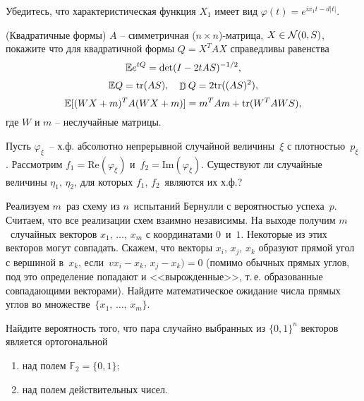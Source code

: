\begin{ordre}
Убедитесь, что характеристическая функция $X_1$ имеет вид $\varphi(t) = e^{ix_1t - d|t|}$.
\end{ordre}

\begin{problem}(Квадратичные формы)
$A$ -- симметричная ($n \times n$)-матрица, $X \in \mathcal{N}(0, S)$, покажите что для квадратичной формы $Q = X^TAX$ справедливы равенства 
\[
\mathrm{{\mathbb E}} e^{tQ} =\det (I - 2t A S)^{-1/2},
\] 
\[
\mathrm{{\mathbb E}} Q = \text{tr}(AS), \quad \mathop{\mathbb{D}}\nolimits Q = 2 \text{tr}((AS)^2),
\]
\[
\mathrm{{\mathbb E}} [ (WX +m)^{T} A (WX +m) ] = m^T A m + \text{tr}(W^TAWS),
\]
где $W$ и $m$ -- неслучайные матрицы.
\end{problem}


\begin{problem}
Пусть $\varphi_{\xi}$~-- х.ф. абсолютно непрерывной случайной величины~$\xi$ с плотностью~$p_{\xi}$. Рассмотрим $f_1 =\text{Re}(\varphi_{\xi})$ и~$f_2 = \text{Im}(\varphi_{\xi}) $. Существуют ли случайные величины $\eta_1,\,\eta_2$, для которых $f_1,\,f_2$~являются их х.ф.? 
\end{problem}



\begin{problem}
Реализуем $m$~раз схему из $n$~испытаний Бернулли с вероятностью успеха~$p$. Считаем, что все реализации схем взаимно независимы. На выходе получим $m$~случайных векторов $x_1,\,\dots,\,x_m$ с координатами $0$~и~$1$. Некоторые из этих векторов могут совпадать. Скажем, что векторы $x_i,\,x_j,\,x_k$ образуют прямой угол с вершиной в~$x_k$, если~$vx_i-x_k,\,x_j - x_k) = 0$ (помимо обычных прямых углов, под это определение попадают и <<вырожденные>>, т.\,е. образованные совпадающими векторами). Найдите математическое ожидание числа прямых углов во множестве~$\{x_1,\,\dots,\,x_m\}$.
\end{problem}






\begin{problem} 
Найдите вероятность того, что пара случайно выбранных из $\{ 0,1\}^n$ векторов является ортогональной 
\begin{enumerate}
\item над полем $\mathbb{F}_2=\{ 0,1\}$; 

\item над полем действительных чисел. 
\end{enumerate}
\end{problem}

